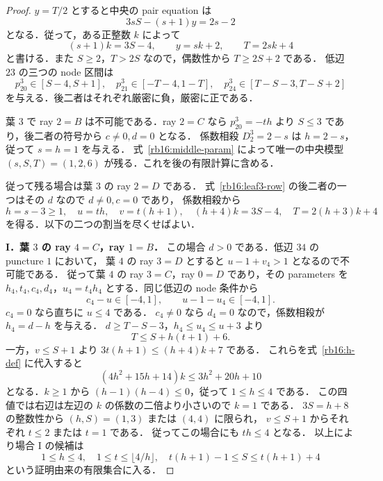\begin{proof}
$y=T/2$ とすると中央の pair equation は
\[
 3sS-(s+1)y=2s-2
\]
となる．従って，ある正整数 $k$ によって
\begin{equation}\label{rb16:middle-param}
 (s+1)k=3S-4,\qquad y=sk+2,\qquad T=2sk+4
\end{equation}
と書ける．また $S\ge2$，$T>2S$ なので，偶数性から $T\ge2S+2$ である．
低辺 $23$ の三つの node 区間は
\begin{equation}\label{rb16:leaf3-row}
 p^3_{20}\in[S-4,S+1],\quad
 p^3_{21}\in[-T-4,1-T],\quad
 p^3_{24}\in[T-S-3,T-S+2]
\end{equation}
を与える．後二者はそれぞれ厳密に負，厳密に正である．

葉 $3$ で ray $2=B$ は不可能である．ray $2=C$ なら
$p^3_{20}=-th$ より $S\le3$ であり，後二者の符号から $c\ne0,d=0$ となる．
係数相殺 $D^3_2=2-s$ は $h=2-s$，従って $s=h=1$ を与える．
式~\eqref{rb16:middle-param} によって唯一の中央模型
$(s,S,T)=(1,2,6)$ が残る．これを後の有限計算に含める．

従って残る場合は葉 $3$ の ray $2=D$ である．
式~\eqref{rb16:leaf3-row} の後二者の一つはその $d$ なので $d\ne0,c=0$ であり，
係数相殺から
\begin{equation}\label{rb16:h-def}
 h=s-3\ge1,\quad u=th,\quad v=t(h+1),\quad
 (h+4)k=3S-4,\quad T=2(h+3)k+4
\end{equation}
を得る．以下の二つの割当を尽くせばよい．

\smallskip\noindent
\textbf{I．葉 $3$ の ray $4=C$，ray $1=B$．}
この場合 $d>0$ である．低辺 $34$ の puncture $1$ において，
葉 $4$ の ray $3=D$ とすると $u-1+v_4>1$ となるので不可能である．
従って葉 $4$ の ray $3=C$，ray $0=D$ であり，その parameters を
$h_4,t_4,c_4,d_4$，$u_4=t_4h_4$ とする．同じ低辺の node 条件から
\[
 c_4-u\in[-4,1],\qquad u-1-u_4\in[-4,1].
\]
$c_4=0$ なら直ちに $u\le4$ である．
$c_4\ne0$ なら $d_4=0$ なので，係数相殺が $h_4=d-h$ を与える．
$d\ge T-S-3$，$h_4\le u_4\le u+3$ より
\[
 T\le S+h(t+1)+6.
\]
一方，$v\le S+1$ より $3t(h+1)\le(h+4)k+7$ である．
これらを式~\eqref{rb16:h-def} に代入すると
\begin{equation}\label{rb16:caseI-bound}
 (4h^2+15h+14)k\le3h^2+20h+10
\end{equation}
となる．$k\ge1$ から $(h-1)(h-4)\le0$，従って $1\le h\le4$ である．
この四値では右辺は左辺の $k$ の係数の二倍より小さいので $k=1$ である．
$3S=h+8$ の整数性から $(h,S)=(1,3)$ または $(4,4)$ に限られ，
$v\le S+1$ からそれぞれ $t\le2$ または $t=1$ である．
従ってこの場合にも $th\le4$ となる．
以上により場合 I の候補は
\begin{equation}\label{rb16:caseI-finite}
 1\le h\le4,\quad 1\le t\le\lfloor4/h\rfloor,\quad
 t(h+1)-1\le S\le t(h+1)+4
\end{equation}
という証明由来の有限集合に入る．


\end{proof}
